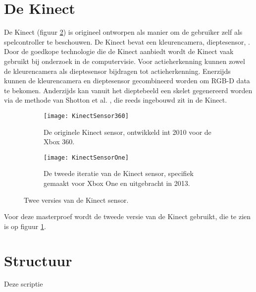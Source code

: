 \section{De Kinect}
De Kinect (figuur \ref{fig:KinectSensorVersies}) is origineel ontworpen als manier om de gebruiker zelf als spelcontroller te beschouwen. De Kinect bevat een kleurencamera, dieptesensor, . Door de goedkope technologie die de Kinect aanbiedt wordt de Kinect vaak gebruikt bij onderzoek in de computervisie. Voor actieherkenning kunnen zowel de kleurencamera als dieptesensor bijdragen tot actieherkenning. Enerzijds kunnen de kleurencamera en dieptesensor gecombineerd worden om RGB-D data te bekomen. Anderzijds kan vanuit het dieptebeeld een skelet gegenereerd worden via de methode van Shotton et al. \cite{Shotton2011}, die reeds ingebouwd zit in de Kinect.
\begin{figure}
	\begin{subfigure}[t]{0.48\textwidth}
		\texttt{[image: KinectSensor360]}
		\caption{De originele Kinect sensor, ontwikkeld int 2010 voor de Xbox 360.}
	\end{subfigure}
	\begin{subfigure}[t]{0.48\textwidth}
		\texttt{[image: KinectSensorOne]}
		\caption{De tweede iteratie van de Kinect sensor, specifiek gemaakt voor Xbox One en uitgebracht in 2013.}
		\label{fig:KinectSensorOne}
	\end{subfigure}
	\caption{Twee versies van de Kinect sensor.}
	\label{fig:KinectSensorVersies}
\end{figure}

Voor deze masterproef wordt de tweede versie van de Kinect gebruikt, die te zien is op figuur \ref{fig:KinectSensorOne}.


\section{Structuur}
Deze scriptie 
